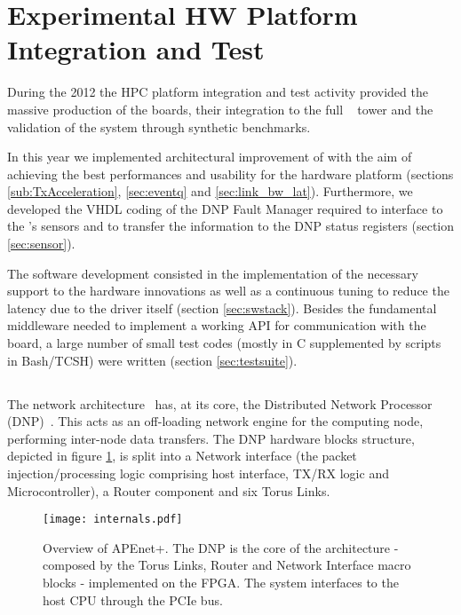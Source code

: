 \section{Experimental HW Platform Integration and Test}
\label{sec:quong}


During the 2012 the HPC platform integration and test activity
provided the massive production of the \apenetp boards, their
integration to the full \quong~\cite{ammendola2011quong} tower and the
validation of the system through synthetic benchmarks.

In this year we implemented architectural improvement of \apenetp with
the aim of achieving the best performances and usability for the
hardware platform (sections \ref{sub:TxAcceleration}, \ref{sec:eventq} and
\ref{sec:link_bw_lat}).  Furthermore, we developed the VHDL coding of
the DNP Fault Manager required to interface to the \apenetp's sensors
and to transfer the information to the DNP status registers
(section \ref{sec:sensor}).

The software development consisted in the implementation of the
necessary support to the hardware innovations as well as a continuous
tuning to reduce the latency due to the driver itself
(section \ref{sec:swstack}).  Besides the fundamental middleware needed to
implement a working API for communication with the board, a large
number of small test codes (mostly in C supplemented by scripts in
Bash/TCSH) were written (section \ref{sec:testsuite}).


\subsection{\apenetp}

The \apenetp network
architecture~\cite{rossetti2011apenet+,ammendola2011apenet+,ammendola2012apenet+}
has, at its core, the Distributed Network Processor
(DNP)~\cite{DNP2012}.
This acts as an off-loading network engine for the computing node,
performing inter-node data transfers.  The DNP hardware blocks
structure, depicted in figure \ref{fig:architecture}, is split into a
Network interface (the packet injection/processing logic comprising
host interface, TX/RX logic and Microcontroller), a Router component
and six Torus Links.

\begin{figure}[!hbt]
  \centering
  \texttt{[image: internals.pdf]}
  \caption{Overview of APEnet+. The DNP is the core of the
architecture - composed by the Torus Links, Router and Network
Interface macro blocks - implemented on the FPGA. The system interfaces
to the host CPU through the PCIe bus.}
  \label{fig:architecture}
\end{figure}

